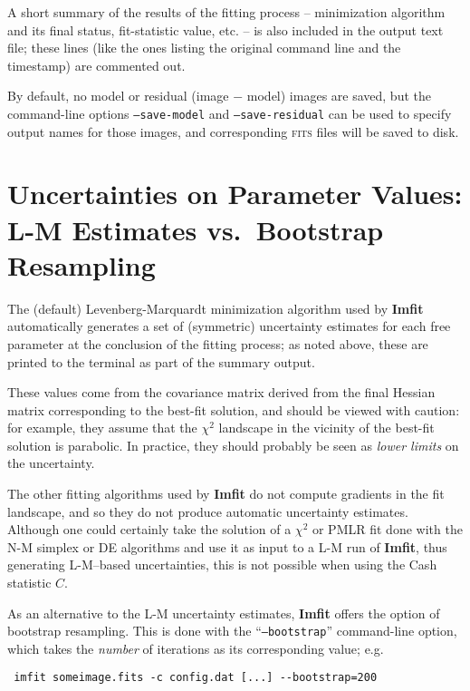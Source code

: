 \documentclass[10pt,a4paper,article]{memoir}
\newcommand{\imfit}{\textbf{Imfit}}
\newcommand{\chisquare}{\ensuremath{\chi^{2}}}
\newcommand{\pmlr}{PMLR}
\begin{document}
A short summary of the results of the fitting process -- minimization
algorithm and its final status, fit-statistic value, etc. -- is also
included in the output text file; these lines (like the ones listing
the original command line and the timestamp) are commented out.

By default, no model or residual (image $-$ model) images are saved, but
the command-line options \texttt{--save-model} and
\texttt{--save-residual} can be used to specify output names for those
images, and corresponding \textsc{fits} files will be saved to disk.



\section{Uncertainties on Parameter Values: L-M Estimates vs.\ Bootstrap Resampling}
\label{sec:bootstrap}

The (default) Levenberg-Marquardt minimization algorithm used by
\imfit{} automatically generates a set of (symmetric) uncertainty
estimates for each free parameter at the conclusion of the fitting
process; as noted above, these are printed to the terminal as part of
the summary output.

These values come from the covariance matrix derived from the final
Hessian matrix corresponding to the best-fit solution, and should be
viewed with caution: for example, they assume that the \chisquare{}
landscape in the vicinity of the best-fit solution is parabolic. In
practice, they should probably be seen as \textit{lower limits} on the
uncertainty.

The other fitting algorithms used by \imfit{} do not compute gradients
in the fit landscape, and so they do not produce automatic uncertainty
estimates. Although one could certainly take the solution of a
\chisquare{} or \pmlr{} fit done with the N-M simplex or DE algorithms
and use it as input to a L-M run of \imfit, thus generating L-M--based
uncertainties, this is not possible when using the Cash statistic $C$.

As an alternative to the L-M uncertainty estimates, \imfit{} offers the
option of bootstrap resampling. This is done with the
``\texttt{--bootstrap}'' command-line option, which takes the
\textit{number} of iterations as its corresponding value; e.g.

\begin{verbatim} imfit someimage.fits -c config.dat [...] --bootstrap=200
\end{verbatim}
\end{document}
